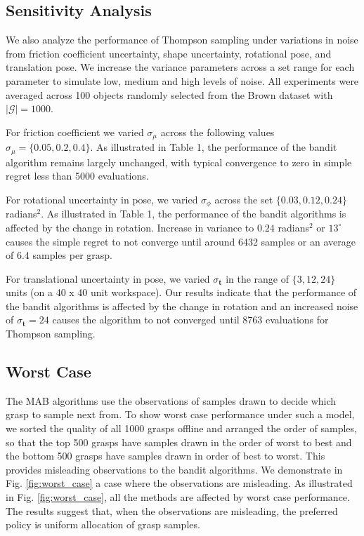 \documentclass[10pt, conference]{ieeeconf}      %
\newcommand{\bt}{\mathbf{t}}
\newcommand{\mG}{\mathcal{G}}
\begin{document}
\subsection{Sensitivity Analysis }\label{sec:sensitivity}
We also analyze the performance of Thompson sampling under variations in noise from friction coefficient uncertainty, shape uncertainty, rotational pose, and translation pose.
We increase the variance parameters across a set range for each parameter to simulate low, medium and high levels of noise.
All experiments were averaged across 100 objects randomly selected  from the Brown dataset with $|\mG| = 1000$.

For friction coefficient we varied $\sigma_{\mu}$ across the following values $\sigma_{\mu} = \lbrace 0.05, 0.2, 0.4 \rbrace$.
As illustrated in Table 1, the performance of the bandit algorithm remains largely unchanged, with typical convergence to zero in simple regret less than 5000 evaluations.

For rotational uncertainty in pose, we varied $\sigma_{\phi}$ across the set $\lbrace 0.03, 0.12,0.24\rbrace$ radians$^2$. As illustrated in Table 1, the performance of the bandit algorithms is affected by the change in rotation. Increase in variance to $0.24$ radians$^2$ or $13^{\circ}$  causes the  simple regret to not converge until around 6432 samples or an average of 6.4 samples per grasp. 

For translational uncertainty in pose, we varied $\sigma_{\bt}$ in the range of $\lbrace 3,12, 24 \rbrace$ units (on a 40 x 40 unit workspace). Our results indicate that the performance of the bandit algorithms is affected by the change in rotation and an increased noise of $\sigma_{\bt} = 24$ causes the algorithm to not converged until 8763 evaluations for Thompson sampling. 



\subsection{Worst Case}
The MAB algorithms use the observations of samples drawn to decide which grasp to sample next from. To show worst case performance under such a model, we sorted the quality of all 1000 grasps offline and arranged the order of samples, so that the top 500 grasps have samples drawn in the order of worst to best and the bottom 500 grasps have samples drawn in order of best to worst. This provides misleading observations to the bandit algorithms. We demonstrate in Fig. \ref{fig:worst_case} a case where the observations are misleading. As illustrated in Fig. \ref{fig:worst_case}, all the methods are affected by worst case performance. The results suggest that, when the observations are misleading, the preferred policy is uniform allocation of grasp samples.
\end{document}

